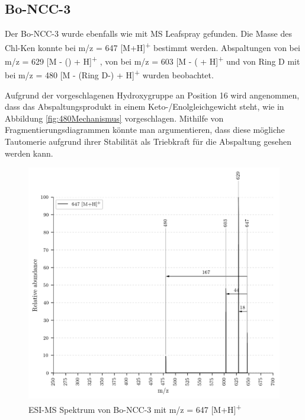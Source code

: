 \pagebreak
\subsection{Bo-NCC-3} \label{sec:ESIMSBoNCC3}

Der Bo-NCC-3 wurde ebenfalls wie mit MS Leafspray gefunden. Die Masse des \gls{Chl-K}en konnte bei m/z = 647 [M+H]\textsuperscript{+} bestimmt werden. Abspaltungen von  bei m/z = 629 [M - () + H]\textsuperscript{+} , von  bei m/z = 603 [M - ( + H]\textsuperscript{+} und von Ring D mit  bei m/z = 480 [M - (Ring D-) + H]\textsuperscript{+} wurden beobachtet. 

Aufgrund der vorgeschlagenen Hydroxygruppe an Position 16 wird angenommen, dass das Abspaltungsprodukt in einem Keto-/Enolgleichgewicht steht, wie in Abbildung \ref{fig:480Mechanismus} vorgeschlagen. Mithilfe von Fragmentierungsdiagrammen könnte man argumentieren, dass diese mögliche Tautomerie aufgrund ihrer Stabilität als Triebkraft für die Abspaltung gesehen werden kann.

\begin{figure}[!htbp]
  \centering
  \includegraphics[width=\textwidth, height=0.6\textwidth]{figures/Kapitel7/Kataboliten/VWA_MS_647.png}
  \caption[ESI-MS Spektrum von Bo-NCC-3, Quelle: Autor]{ESI-MS Spektrum von Bo-NCC-3 mit m/z = 647 [M+H]\textsuperscript{+}}
  \label{fig:647MH}
\end{figure}

